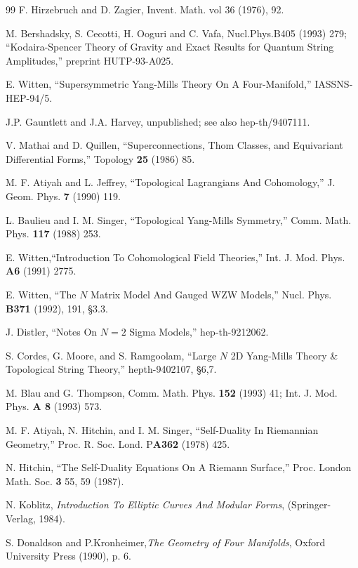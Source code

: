 \documentclass[12pt]{article}
\numberwithin{equation}{section}
\begin{document}
\begin{thebibliography}{99}
  F. Hirzebruch and D. Zagier, Invent. Math. vol 36 (1976), 92.

  M. Bershadsky, S. Cecotti, H. Ooguri and C. Vafa, Nucl.Phys.B405
  (1993) 279; ``{Kodaira-Spencer Theory of Gravity and Exact Results
  for Quantum String Amplitudes},'' preprint HUTP-93-A025.

  E. Witten, ``{Supersymmetric Yang-Mills Theory On A
  Four-Manifold,}'' IASSNS-HEP-94/5.


  J.P. Gauntlett and J.A. Harvey, unpublished; see also hep-th/9407111.

  V. Mathai and D. Quillen, ``Superconnections, Thom Classes, and
  Equivariant Differential Forms,'' Topology {\bf 25} (1986) 85.

  M. F. Atiyah and L. Jeffrey, ``Topological Lagrangians And
  Cohomology,'' J. Geom. Phys. {\bf 7} (1990) 119.

  L. Baulieu and I. M. Singer, ``Topological Yang-Mills Symmetry,''
  Comm. Math. Phys. {\bf 117} (1988) 253.

  E. Witten,``Introduction To Cohomological Field Theories,'' Int. J.
  Mod. Phys. {\bf A6} (1991) 2775.

  E. Witten, ``The $N$ Matrix Model And Gauged WZW Models,'' Nucl.
  Phys. {\bf B371} (1992), 191, \S 3.3.

  J. Distler, ``Notes On $N=2$ Sigma Models,'' hep-th-9212062.

  S. Cordes, G. Moore, and S. Ramgoolam, ``Large $N$  2D Yang-Mills
  Theory \& Topological String Theory,'' hepth-9402107, \S6,7.

  M. Blau and G. Thompson, Comm. Math. Phys. {\bf 152} (1993) 41;
  Int. J. Mod. Phys. {\bf A 8} (1993) 573.

  M. F. Atiyah, N. Hitchin, and I. M. Singer, ``Self-Duality In
  Riemannian Geometry,'' Proc. R. Soc. Lond. P{\bf A362} (1978) 425.

  N. Hitchin, ``The Self-Duality Equations On A Riemann Surface,''
  Proc. London Math. Soc. {\bf 3} 55, 59 (1987).

  N. Koblitz, {\it Introduction To Elliptic Curves And Modular
  Forms}, (Springer-Verlag, 1984).

  S. Donaldson and P.Kronheimer,{\it The Geometry of Four Manifolds},
  Oxford University Press (1990), p. 6.


\end{thebibliography}
\end{document}

